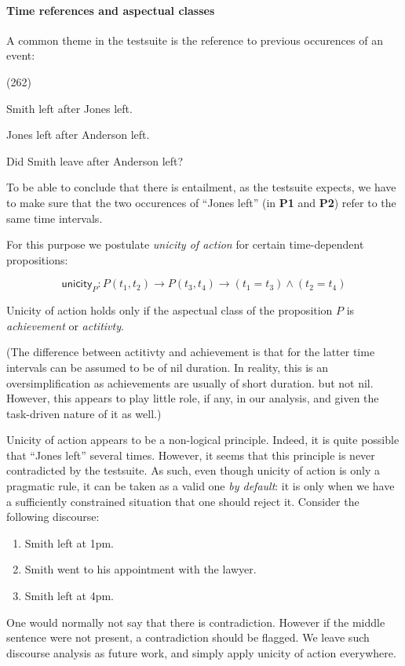 \documentclass[a4paper,11pt]{article}
\newcommand\hyp{\item[H]}
\newcommand\fracasex[2]{\begin{lingex}\item[(#1)] \begin{subex} #2 \end{subex} \end{lingex} }
\newcommand\constant[1]{\mathsf{#1}}
\begin{document}
\paragraph{Time references and aspectual classes}

A common theme in the testsuite is the reference to previous
occurences of an event:

\fracasex{262}{
\item	Smith left after Jones left.
\item	Jones left after Anderson left.
\hyp 	Did Smith leave after Anderson left?
}

To be able to conclude that there is entailment, as the testsuite expects, we have to make sure
that the two occurences of ``Jones left'' (in \textbf{P1} and \textbf{P2}) refer to the
same time intervals.

For this purpose we postulate \emph{unicity of action} for certain time-dependent
propositions:

\[\constant{unicity}_P : P (t_1,t_2) → P (t_3,t_4) → (t_1 = t_3) ∧ (t_2 = t_4)\]

Unicity of action holds only if the aspectual class of the proposition
$P$ is \emph{achievement} or \emph{actitivty}.

(The difference between actitivty and achievement is that for the
latter time intervals can be assumed to be of nil duration. In reality, this is an oversimplification as achievements are usually of short duration. but not nil. However, 
this appears to play little role, if any, in our analysis, and given the task-driven nature of it as well.)

Unicity of action appears to be a non-logical principle. Indeed, it is
quite possible that ``Jones left'' several times. However, it seems
that this principle is never contradicted by the testsuite. As such,
even though unicity of action is only a pragmatic rule, it can be
taken as a valid one \emph{by default}: it is only when we have a
sufficiently constrained situation that one should reject it. Consider
the following discourse:
\begin{enumerate}[parsep=0pt,itemsep=1pt,label=(\arabic*)]
\item Smith left at 1pm.
\item Smith went to his appointment with the lawyer.
\item Smith left at 4pm.
\end{enumerate}
One would normally not say that there is contradiction. However if the
middle sentence were not present, a contradiction should be
flagged. We leave such discourse analysis as future work, and simply
apply unicity of action everywhere.
\end{document}
